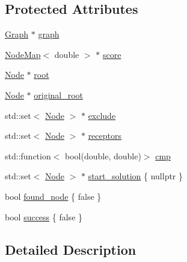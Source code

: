 \subsection*{Protected Attributes}
\begin{DoxyCompactItemize}
\item 
\hyperlink{namespacederegnet_a55b76c55bbabc682cbc61f8b9948799e}{Graph} $\ast$ \hyperlink{classderegnet_1_1DeregnetStartHeuristic_a4da8e53fc7c0fa3dbe0e3ef07296d75e}{graph}
\item 
\hyperlink{namespacederegnet_ae102b707ae1d6f83c639ece5e0dd5658}{Node\+Map}$<$ double $>$ $\ast$ \hyperlink{classderegnet_1_1DeregnetStartHeuristic_ae03300e79482975e98f95cba19ad32b0}{score}
\item 
\hyperlink{namespacederegnet_a744bad34f2de9856d36715a445f027f3}{Node} $\ast$ \hyperlink{classderegnet_1_1DeregnetStartHeuristic_a4605d41352e3adf1f9f9f32466a4e61e}{root}
\item 
\hyperlink{namespacederegnet_a744bad34f2de9856d36715a445f027f3}{Node} $\ast$ \hyperlink{classderegnet_1_1DeregnetStartHeuristic_a22c9ec9b11605201c87dbac622d7618e}{original\+\_\+root}
\item 
std\+::set$<$ \hyperlink{namespacederegnet_a744bad34f2de9856d36715a445f027f3}{Node} $>$ $\ast$ \hyperlink{classderegnet_1_1DeregnetStartHeuristic_aa22c6581cd404bf7ac325850b28dc951}{exclude}
\item 
std\+::set$<$ \hyperlink{namespacederegnet_a744bad34f2de9856d36715a445f027f3}{Node} $>$ $\ast$ \hyperlink{classderegnet_1_1DeregnetStartHeuristic_ab80c046ff2b7c64086fceb84987b3e50}{receptors}
\item 
std\+::function$<$ bool(double, double)$>$ \hyperlink{classderegnet_1_1DeregnetStartHeuristic_aa5af4d29e3b276c0046c997c16cca3a1}{cmp}
\item 
std\+::set$<$ \hyperlink{namespacederegnet_a744bad34f2de9856d36715a445f027f3}{Node} $>$ $\ast$ \hyperlink{classderegnet_1_1DeregnetStartHeuristic_a7450e11ca0a265b055f95e7832b65e2f}{start\+\_\+solution} \{ nullptr \}
\item 
bool \hyperlink{classderegnet_1_1DeregnetStartHeuristic_a1ca705794583fb3b6e563efeceb4445e}{found\+\_\+node} \{ false \}
\item 
bool \hyperlink{classderegnet_1_1DeregnetStartHeuristic_a72fd16ee027f6aa973f1ff29746addba}{success} \{ false \}
\end{DoxyCompactItemize}


\subsection{Detailed Description}


